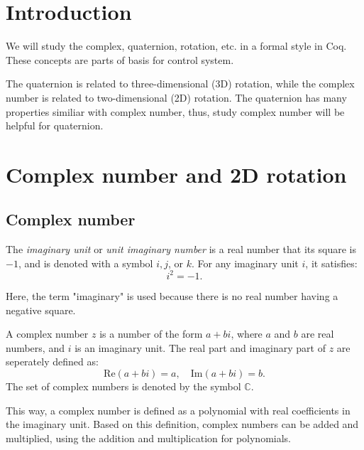 \documentclass[runningheads,a4paper,english]{llncs}[2022/01/12]
\newcommand{\bC}{\mathbb{C}}
\begin{document}


\section{Introduction}\label{intro}

We will study the complex, quaternion, rotation, etc. in a formal style in Coq.
These concepts are parts of basis for control system.

The quaternion is related to three-dimensional (3D) rotation, while the complex number is related to two-dimensional (2D) rotation.
The quaternion has many properties similiar with complex number, thus, study complex number will be helpful for quaternion.

\section{Complex number and 2D rotation}
  
\subsection{Complex number}

\begin{definition}
  The \textit{imaginary unit} or \textit{unit imaginary number} is a real number that its square is $-1$, and is denoted with a symbol $i, j$, or $k$.
  For any imaginary unit $i$, it satisfies:
  \begin{equation}
    i^2=-1.
  \end{equation}
\end{definition}

Here, the term "imaginary" is used because there is no real number having a negative square.

\begin{definition}
  A complex number $z$ is a number of the form $a+bi$, where $a$ and $b$ are real numbers, and $i$ is an imaginary unit.
  The real part and imaginary part of $z$ are seperately defined as:
  \begin{equation}
    \mathrm{Re}(a+bi)=a,\quad \mathrm{Im}(a+bi)=b.
  \end{equation}
  The set of complex numbers is denoted by the symbol $\bC$.
\end{definition}

This way, a complex number is defined as a polynomial with real coefficients in the imaginary unit.
Based on this definition, complex numbers can be added and multiplied, using the addition and multiplication for polynomials.
\end{document}
